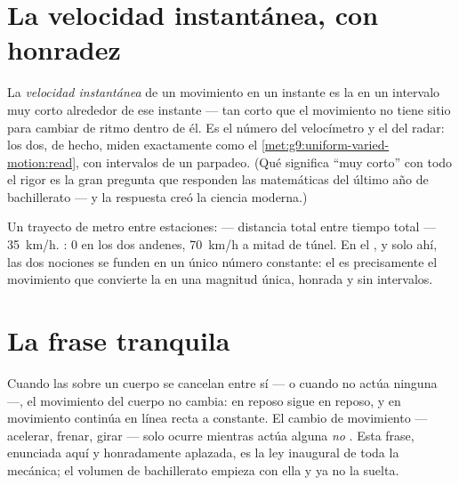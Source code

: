 \section{La velocidad instantánea, con honradez}

\begin{definition}\label{def:g9:uniform-varied-motion:instant}
La \emph{velocidad instantánea} de un
movimiento en un instante es la  en un intervalo
muy corto alrededor de ese instante --- tan corto que el movimiento no
tiene sitio para cambiar de ritmo dentro de él. Es el número del
velocímetro y el del radar: los dos, de hecho, miden exactamente
como el \cref{met:g9:uniform-varied-motion:read}, con intervalos de un
parpadeo. (Qué significa ``muy corto'' con todo el rigor es la gran
pregunta que responden las matemáticas del último año de bachillerato
--- y la respuesta creó la ciencia moderna.)
\end{definition}

\begin{example}\label{ex:g9:uniform-varied-motion:sidebyside}
Un trayecto de metro entre estaciones:  ---
distancia total entre tiempo total --- \qty{35}{km/h}.
: $0$ en los dos andenes, \qty{70}{km/h} a
mitad de túnel. En el , y solo ahí, las dos
nociones se funden en un único número constante: el
 es precisamente el movimiento que convierte la
 en una magnitud única, honrada y sin intervalos.
\end{example}

\section{La frase tranquila}

\begin{proposition}\label{prop:g9:uniform-varied-motion:inertia}
Cuando las  sobre un cuerpo se cancelan entre sí --- o
cuando no actúa ninguna ---, el movimiento del cuerpo no cambia: en
reposo sigue en reposo, y en movimiento continúa en línea recta a
 constante. El cambio de movimiento --- acelerar,
frenar, girar --- solo ocurre mientras actúa alguna
 \emph{no }. Esta frase, enunciada aquí y
honradamente aplazada, es la ley inaugural de toda la mecánica; el
volumen de bachillerato empieza con ella y ya no la suelta.
\end{proposition}

